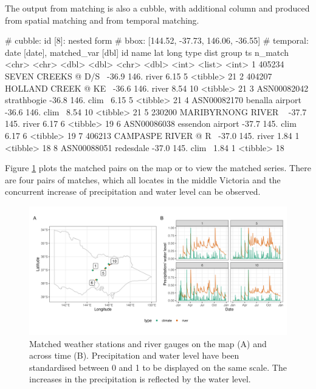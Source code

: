 \documentclass[
]{jss}
\begin{document}
The output from matching is also a cubble, with additional column
 and  produced from spatial matching and
 from temporal matching.

\begin{CodeChunk}
\begin{CodeOutput}
# cubble:   id [8]: nested form
# bbox:     [144.52, -37.73, 146.06, -36.55]
# temporal: date [date], matched_var [dbl]
  id          name                  lat  long type   dist group ts       n_match
  <chr>       <chr>               <dbl> <dbl> <chr> <dbl> <int> <list>     <int>
1 405234      SEVEN CREEKS @ D/S~ -36.9  146. river  6.15     5 <tibble>      21
2 404207      HOLLAND CREEK @ KE~ -36.6  146. river  8.54    10 <tibble>      21
3 ASN00082042 strathbogie         -36.8  146. clim~  6.15     5 <tibble>      21
4 ASN00082170 benalla airport     -36.6  146. clim~  8.54    10 <tibble>      21
5 230200      MARIBYRNONG RIVER ~ -37.7  145. river  6.17     6 <tibble>      19
6 ASN00086038 essendon airport    -37.7  145. clim~  6.17     6 <tibble>      19
7 406213      CAMPASPE RIVER @ R~ -37.0  145. river  1.84     1 <tibble>      18
8 ASN00088051 redesdale           -37.0  145. clim~  1.84     1 <tibble>      18
\end{CodeOutput}
\end{CodeChunk}

Figure \ref{fig:matching} plots the matched pairs on the map or to view
the matched series. There are four pairs of matches, which all locates
in the middle Victoria and the concurrent increase of precipitation and
water level can be observed.

\begin{CodeChunk}
\begin{figure}

{\centering \includegraphics[width=1\linewidth]{figures/matching} 

}

\caption[Matched weather stations and river gauges on the map (A) and across time (B)]{Matched weather stations and river gauges on the map (A) and across time (B). Precipitation and water level have been standardised between 0 and 1 to be displayed on the same scale. The increases in the precipitation is reflected by the water level.}\label{fig:matching}
\end{figure}
\end{CodeChunk}
\end{document}
